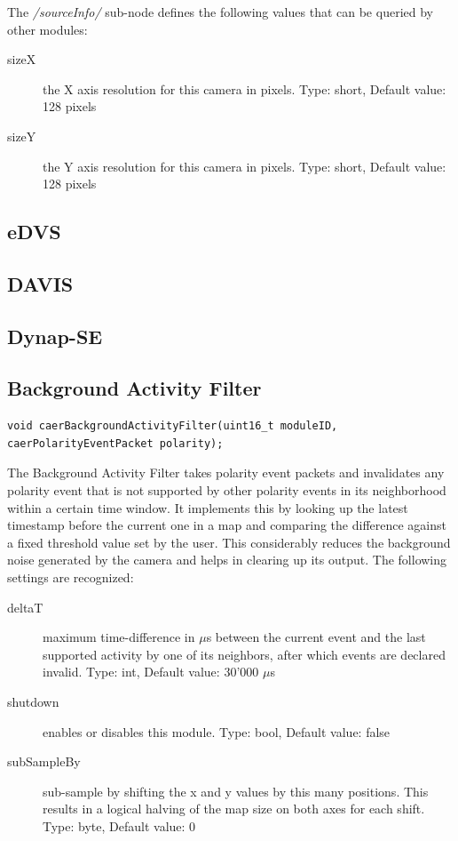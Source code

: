 \documentclass[a4paper,12pt]{report}
\begin{document}
The \emph{/sourceInfo/} sub-node defines the following values that can be queried by other modules:
\begin{description}
\item[sizeX] the X axis resolution for this camera in pixels.
\subitem Type: short, Default value: 128 pixels
\item[sizeY] the Y axis resolution for this camera in pixels.
\subitem Type: short, Default value: 128 pixels
\end{description}
\subsection{eDVS}
\subsection{DAVIS}
\subsection{Dynap-SE}
\subsection{Background Activity Filter} \label{subsec:backgroundactivityfilter}

\begin{lstlisting}
void caerBackgroundActivityFilter(uint16_t moduleID, caerPolarityEventPacket polarity);
\end{lstlisting}

The Background Activity Filter takes polarity event packets and invalidates any polarity event that is not supported by other polarity events in its neighborhood within a certain time window.
It implements this by looking up the latest timestamp before the current one in a map and comparing the difference against a fixed threshold value set by the user.
This considerably reduces the background noise generated by the camera and helps in clearing up its output.
\clearpage
The following settings are recognized:
\begin{description}
\item[deltaT] maximum time-difference in $\mu$s between the current event and the last supported activity by one of its neighbors, after which events are declared invalid.
\subitem Type: int, Default value: 30'000 $\mu$s
\item[shutdown] enables or disables this module.
\subitem Type: bool, Default value: false
\item[subSampleBy] sub-sample by shifting the x and y values by this many positions. This results in a logical halving of the map size on both axes for each shift.
\subitem Type: byte, Default value: 0
\end{description}
\end{document}
